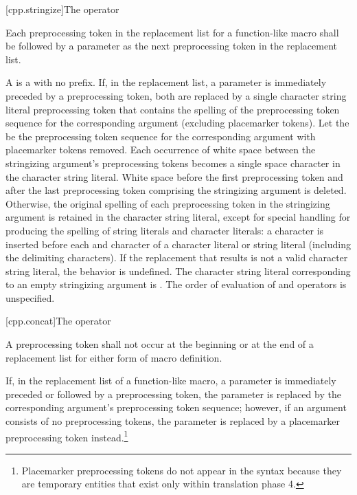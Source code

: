 [cpp.stringize]{The \tcode{\#} operator}%
%

\pnum
Each
\tcode{\#}
preprocessing token in the replacement list for a function-like
macro shall be followed by a parameter as the next preprocessing
token in the replacement list.

\pnum
A  is a  with no prefix.
If, in the replacement list, a parameter is immediately
preceded by a
\tcode{\#}
preprocessing token,
both are replaced by a single character string literal preprocessing token that
contains the spelling of the preprocessing token sequence for the
corresponding argument (excluding placemarker tokens).
Let the  be the preprocessing token sequence
for the corresponding argument with placemarker tokens removed.
Each occurrence of white space between the stringizing argument's preprocessing
tokens becomes a single space character in the character string literal.
White space before the first preprocessing token and after the last
preprocessing token comprising the stringizing argument is deleted.
Otherwise, the original spelling of each preprocessing token in the
stringizing argument is retained in the character string literal,
except for special handling for producing the spelling of
string literals and character literals:
a
\tcode{\textbackslash}
character is inserted before each
and
\tcode{\textbackslash}
character of a character literal or string literal
(including the delimiting
characters).
If the replacement that results is not a valid character string literal,
the behavior is undefined. The character string literal corresponding to
an empty stringizing argument is .
The order of evaluation of
\tcode{\#}
and
\tcode{\#\#}
operators is unspecified.

[cpp.concat]{The \tcode{\#\#} operator}%
%

\pnum
A
\tcode{\#\#}
preprocessing token shall not occur at the beginning or
at the end of a replacement list for either form
of macro definition.

\pnum
If, in the replacement list of a function-like macro, a parameter is
immediately preceded or followed by a
\tcode{\#\#}
preprocessing token, the parameter is replaced by the
corresponding argument's preprocessing token sequence; however, if an argument consists of no preprocessing tokens, the parameter is
replaced by a placemarker preprocessing token instead.\footnote{Placemarker preprocessing tokens do not appear in the syntax
because they are temporary entities that exist only within translation phase 4.}

